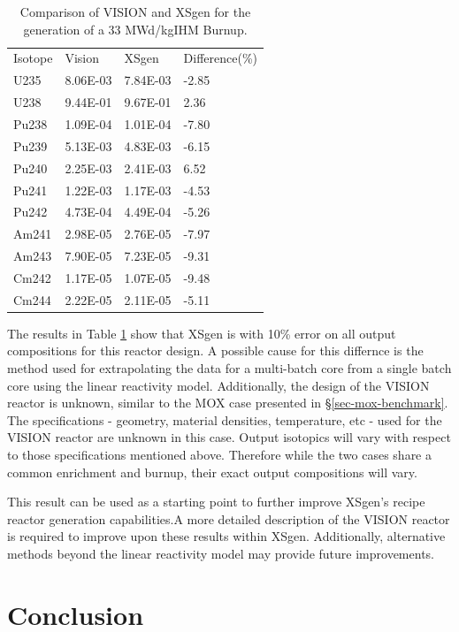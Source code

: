 \documentclass{article}
\begin{document}
\begin{table}[!htb]
\centering
\caption{Comparison of VISION and XSgen for the generation of a 33 MWd/kgIHM Burnup.}
\label{tab:recipe}
\begin{tabular}{llll}
Isotope & Vision & XSgen & Difference(\%) \\
U235 & 8.06E-03 & 7.84E-03 & -2.85 \\
U238 & 9.44E-01 & 9.67E-01 & 2.36 \\
Pu238 & 1.09E-04 & 1.01E-04 & -7.80 \\
Pu239 & 5.13E-03 & 4.83E-03 & -6.15 \\
Pu240 & 2.25E-03 & 2.41E-03 & 6.52 \\
Pu241 & 1.22E-03 & 1.17E-03 & -4.53 \\
Pu242 & 4.73E-04 & 4.49E-04 & -5.26 \\
Am241 & 2.98E-05 & 2.76E-05 & -7.97 \\
Am243 & 7.90E-05 & 7.23E-05 & -9.31 \\
Cm242 & 1.17E-05 & 1.07E-05 & -9.48 \\
Cm244 & 2.22E-05 & 2.11E-05 & -5.11 \\
\end{tabular}
\end{table}

The results in Table \ref{tab:recipe} show that XSgen is with 10\% error on all output
compositions for this reactor design. A possible cause for this differnce is the
method used for extrapolating the data for a multi-batch core from a single batch core using
the linear reactivity model. Additionally, the design of the VISION reactor is unknown, similar to the MOX case presented
in \S\ref{sec-mox-benchmark}. The specifications - geometry, material densities, temperature, etc - used for the VISION reactor
are unknown in this case. Output isotopics will vary with respect to those specifications mentioned above. Therefore while
the two cases share a common enrichment and burnup, their exact output compositions will vary. 

This result can be used as a starting point to further improve XSgen's recipe reactor generation capabilities.A more detailed 
description of the VISION reactor is required to improve upon these results within XSgen. Additionally, alternative methods 
beyond the linear reactivity model\cite{linear} may provide future improvements.

\section{Conclusion}
\end{document}
